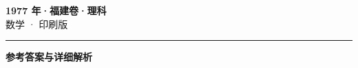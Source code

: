\documentclass[zihao=5, a4paper]{ctexart}
\begin{document}
\begin{center}
  {\Large\bfseries 1977 年·福建卷·理科}\\[4pt]
  {\large 数学 · 印刷版}
\end{center}
\medskip
{}

\par\bigskip\hrule\bigskip
{}
\begin{center}{\large\bfseries 参考答案与详细解析}\end{center}
\smallskip

\end{document}
